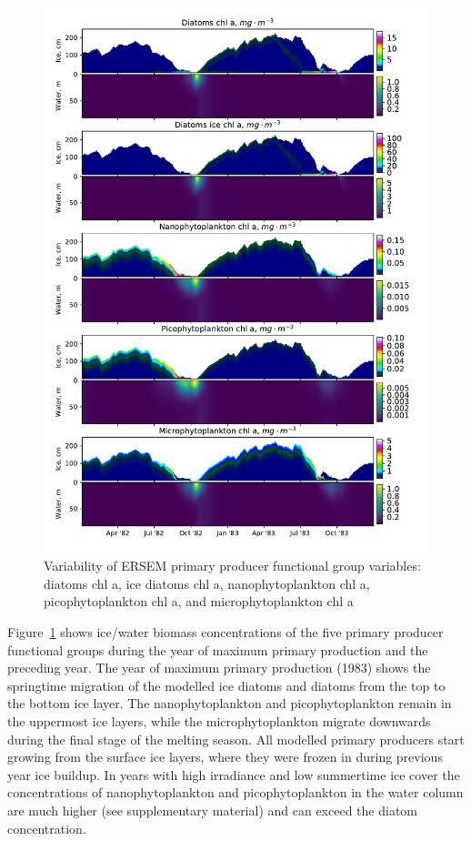 \documentclass[gmd, manuscript]{copernicus}
\begin{document}
\begin{figure}[htbp]
\includegraphics[width=13.6cm]{fig04}
    \caption{Variability of \textrm{ERSEM} primary producer functional group variables: diatoms chl a, ice diatoms chl a, nanophytoplankton chl a, picophytoplankton chl a, and microphytoplankton chl a}
\label{fig:primary_producers}
\end{figure}

Figure~\ref{fig:primary_producers} shows ice/water biomass concentrations of the five primary producer functional groups during the year of maximum primary production and the preceding year.
The year of maximum primary production (1983) shows the springtime migration of the modelled ice diatoms and diatoms from the top to the bottom ice layer.
The nanophytoplankton and picophytoplankton remain in the uppermost ice layers, while the microphytoplankton migrate downwards during the final stage of the melting season.
All modelled primary producers start growing from the surface ice layers, where they were frozen in during previous year ice buildup.
In years with high irradiance and low summertime ice cover the concentrations of nanophytoplankton and picophytoplankton in the water column are much higher (see supplementary material) and can exceed the diatom concentration.
\end{document}
